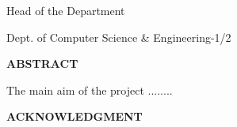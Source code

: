 \documentclass[12pt,a4wide]{report}
\theoremstyle{plain}
\theoremstyle{definition}
\theoremstyle{remark}
\begin{document}
\noindent \hfill Head of the Department

\noindent\hfill\hfill Dept. of Computer Science \& Engineering-1/2\\

\clearpage




\begin{center}
{\Large{\bf{ABSTRACT}}}
\end{center}


The main aim of the project ........

\clearpage

 \setcounter{page}{3}
\begin{center}
{\large{\bf{ACKNOWLEDGMENT}}}
\end{center}

\clearpage

\tableofcontents
\clearpage
\listoffigures
\listoftables


\newpage

\setcounter{page}{1}








\printbibliography[title={References}, heading=bibintoc]

\nocite{golub, gerla, m1, chang} %
\printbibliography[check=notcited, title={Bibliography}, heading=bibintoc]
\end{document}
